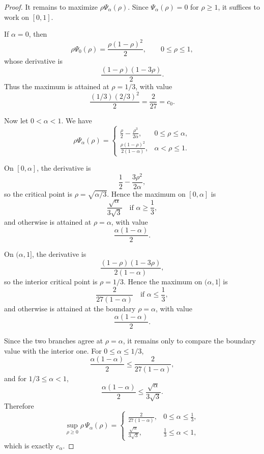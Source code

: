 \documentclass[10pt,a4paper]{amsart}
\begin{document}
\begin{proof}
It remains to maximize \(\rho\Psi_\alpha(\rho)\). Since \(\Psi_\alpha(\rho)=0\) for \(\rho\ge 1\), it suffices to work on \([0,1]\).

If \(\alpha=0\), then
\[
\rho\Psi_0(\rho)=\frac{\rho(1-\rho)^2}{2},\qquad 0\le \rho\le 1,
\]
whose derivative is
\[
\frac{(1-\rho)(1-3\rho)}{2}.
\]
Thus the maximum is attained at \(\rho=1/3\), with value
\[
\frac{(1/3)(2/3)^2}{2}=\frac{2}{27}=c_0.
\]

Now let \(0<\alpha<1\). We have
\[
\rho\Psi_\alpha(\rho)=
\begin{cases}
\displaystyle
\frac{\rho}{2}-\frac{\rho^3}{2\alpha}, & 0\le \rho\le \alpha,\\[2ex]
\displaystyle
\frac{\rho(1-\rho)^2}{2(1-\alpha)}, & \alpha<\rho\le 1.
\end{cases}
\]

On \([0,\alpha]\), the derivative is
\[
\frac12-\frac{3\rho^2}{2\alpha},
\]
so the critical point is \(\rho=\sqrt{\alpha/3}\). Hence the maximum on \([0,\alpha]\) is
\[
\frac{\sqrt{\alpha}}{3\sqrt3}
\quad\text{if }\alpha\ge \frac13,
\]
and otherwise is attained at \(\rho=\alpha\), with value
\[
\frac{\alpha(1-\alpha)}{2}.
\]

On \((\alpha,1]\), the derivative is
\[
\frac{(1-\rho)(1-3\rho)}{2(1-\alpha)},
\]
so the interior critical point is \(\rho=1/3\). Hence the maximum on \((\alpha,1]\) is
\[
\frac{2}{27(1-\alpha)}
\quad\text{if }\alpha\le \frac13,
\]
and otherwise is attained at the boundary \(\rho=\alpha\), with value
\[
\frac{\alpha(1-\alpha)}{2}.
\]

Since the two branches agree at \(\rho=\alpha\), it remains only to compare the boundary value with the interior one. For \(0\le \alpha\le 1/3\),
\[
\frac{\alpha(1-\alpha)}{2}\le \frac{2}{27(1-\alpha)},
\]
and for \(1/3\le \alpha<1\),
\[
\frac{\alpha(1-\alpha)}{2}\le \frac{\sqrt{\alpha}}{3\sqrt3}.
\]
Therefore
\[
\sup_{\rho\ge 0}\rho\,\Psi_\alpha(\rho)=
\begin{cases}
\displaystyle
\frac{2}{27(1-\alpha)}, & 0\le \alpha\le \frac13,\\[2ex]
\displaystyle
\frac{\sqrt{\alpha}}{3\sqrt3}, & \frac13\le \alpha<1,
\end{cases}
\]
which is exactly \(c_\alpha\).
\end{proof}
\end{document}
